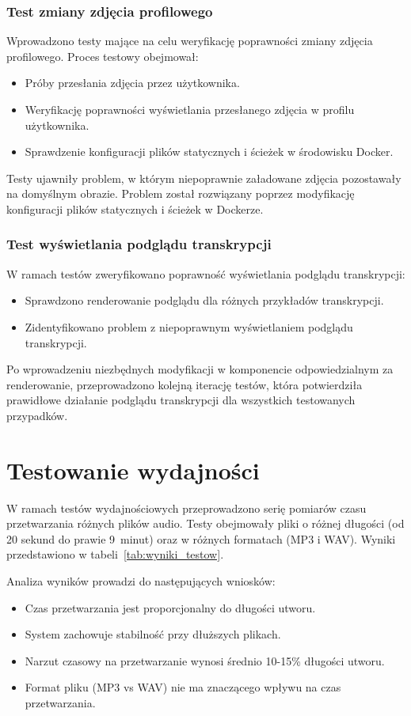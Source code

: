 \documentclass[a4paper,twoside,12pt]{book}
\begin{document}
\subsubsection{Test zmiany zdjęcia profilowego}
Wprowadzono testy mające na celu weryfikację poprawności zmiany zdjęcia profilowego. Proces testowy obejmował:
\begin{itemize}
\item Próby przesłania zdjęcia przez użytkownika.
\item Weryfikację poprawności wyświetlania przesłanego zdjęcia w profilu użytkownika.
\item Sprawdzenie konfiguracji plików statycznych i ścieżek w środowisku Docker.
\end{itemize}
Testy ujawniły problem, w którym niepoprawnie załadowane zdjęcia pozostawały na domyślnym obrazie. Problem został rozwiązany poprzez modyfikację konfiguracji plików statycznych i ścieżek w Dockerze.

\subsubsection{Test wyświetlania podglądu transkrypcji}
W ramach testów zweryfikowano poprawność wyświetlania podglądu transkrypcji:
\begin{itemize}
\item Sprawdzono renderowanie podglądu dla różnych przykładów transkrypcji.
\item Zidentyfikowano problem z niepoprawnym wyświetlaniem podglądu transkrypcji.
\end{itemize}
Po wprowadzeniu niezbędnych modyfikacji w komponencie odpowiedzialnym za renderowanie, przeprowadzono kolejną iterację testów, która potwierdziła prawidłowe działanie podglądu transkrypcji dla wszystkich testowanych przypadków.

\section{Testowanie wydajności}
W ramach testów wydajnościowych przeprowadzono serię pomiarów czasu przetwarzania różnych plików audio. Testy obejmowały pliki o różnej długości (od 20 sekund do prawie 9~minut) oraz w różnych formatach (MP3 i WAV). Wyniki przedstawiono w tabeli~\ref{tab:wyniki_testow}. 

Analiza wyników prowadzi do następujących wniosków:
\begin{itemize}
	\item Czas przetwarzania jest proporcjonalny do długości utworu.
	\item System zachowuje stabilność przy dłuższych plikach.
	\item Narzut czasowy na przetwarzanie wynosi średnio 10-15\% długości utworu.
	\item Format pliku (MP3 vs WAV) nie ma znaczącego wpływu na czas przetwarzania.
\end{itemize}
\end{document}
